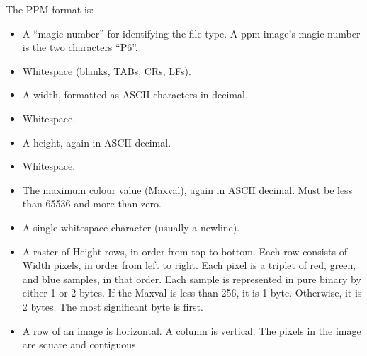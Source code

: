\documentclass{article}
\begin{document}
        The PPM format is:
        \begin{itemize}
            \item A ``magic number'' for identifying the file type. A ppm image's magic number is the two characters ``P6''.
            \item Whitespace (blanks, TABs, CRs, LFs).
            \item A width, formatted as ASCII characters in decimal.
            \item Whitespace.
            \item A height, again in ASCII decimal.
            \item Whitespace.
            \item The maximum colour value (Maxval), again in ASCII decimal. Must be less than 65536 and more than zero.
            \item A single whitespace character (usually a newline).
            \item A raster of Height rows, in order from top to bottom. Each row consists of Width pixels, in order from left to right.
            Each pixel is a triplet of red, green, and blue samples, in that order. Each sample is represented in pure binary by either 1
            or 2 bytes. If the Maxval is less than 256, it is 1 byte. Otherwise, it is 2 bytes. The most significant byte is first.
            \item A row of an image is horizontal. A column is vertical. The pixels in the image are square and contiguous.
        \end{itemize}
        
   
\end{document}
